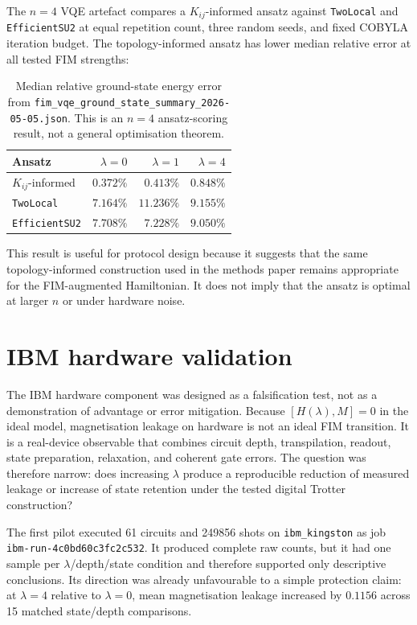 \documentclass[preprint,aps,physrev,superscriptaddress,floatfix,longbibliography]{revtex4-2}
\begin{document}
The $n=4$ VQE artefact compares a $K_{ij}$-informed ansatz against
\texttt{TwoLocal} and \texttt{EfficientSU2} at equal repetition count,
three random seeds, and fixed COBYLA iteration budget. The topology-informed
ansatz has lower median relative error at all tested FIM strengths:
%
\begin{table}[tb]
\centering
\small
\begin{tabular}{lrrr}
\toprule
Ansatz & $\lambda=0$ & $\lambda=1$ & $\lambda=4$ \\
\midrule
$K_{ij}$-informed & $0.372\%$ & $0.413\%$ & $0.848\%$ \\
\texttt{TwoLocal} & $7.164\%$ & $11.236\%$ & $9.155\%$ \\
\texttt{EfficientSU2} & $7.708\%$ & $7.228\%$ & $9.050\%$ \\
\bottomrule
\end{tabular}
\caption{Median relative ground-state energy error from
\texttt{fim\_vqe\_ground\_state\_summary\_2026-05-05.json}. This is an
$n=4$ ansatz-scoring result, not a general optimisation theorem.}
\label{tab:vqe}
\end{table}

This result is useful for protocol design because it suggests that the same
topology-informed construction used in the methods paper remains appropriate
for the FIM-augmented Hamiltonian. It does not imply that the ansatz is optimal
at larger $n$ or under hardware noise.

\section{IBM hardware validation}

The IBM hardware component was designed as a falsification test, not as a
demonstration of advantage or error mitigation. Because
$[H(\lambda),M]=0$ in the ideal model, magnetisation leakage on hardware is not
an ideal FIM transition. It is a real-device observable that combines circuit
depth, transpilation, readout, state preparation, relaxation, and coherent gate
errors. The question was therefore narrow: does increasing $\lambda$ produce a
reproducible reduction of measured leakage or increase of state retention under
the tested digital Trotter construction?

The first pilot executed 61 circuits and 249856 shots on \texttt{ibm\_kingston}
as job \texttt{ibm-run-4c0bd60c3fc2c532}. It produced complete raw counts, but it
had one sample per $\lambda$/depth/state condition and therefore supported only
descriptive conclusions. Its direction was already unfavourable to a simple
protection claim: at $\lambda=4$ relative to $\lambda=0$, mean magnetisation
leakage increased by $0.1156$ across 15 matched state/depth comparisons.
\end{document}
